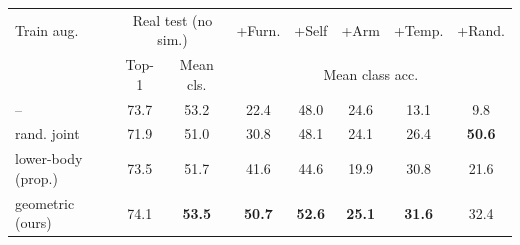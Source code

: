 \begin{tabular}{@{}lccccccc@{}}
\toprule
Train aug. & \multicolumn{2}{c}{Real test (no sim.)} & +Furn. & +Self & +Arm & +Temp. & +Rand. \\
 & Top-1 & Mean cls. & \multicolumn{5}{c}{Mean class acc.} \\
\midrule
-- & 73.7 & 53.2 & 22.4 & 48.0 & 24.6 & 13.1 & 9.8 \\
rand. joint & 71.9 & 51.0 & 30.8 & 48.1 & 24.1 & 26.4 & \textbf{50.6} \\
lower-body (prop.) & 73.5 & 51.7 & 41.6 & 44.6 & 19.9 & 30.8 & 21.6 \\
geometric (ours) & 74.1 & \textbf{53.5} & \textbf{50.7} & \textbf{52.6} & \textbf{25.1} & \textbf{31.6} & 32.4 \\
\bottomrule
\end{tabular}
